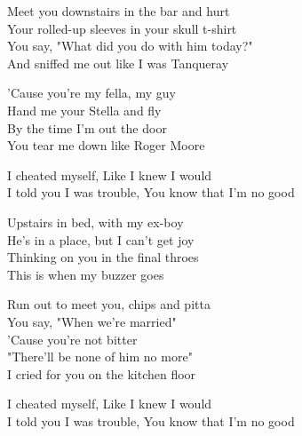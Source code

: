 \begin{paracol}{3}




    Meet you downstairs in the bar and hurt \\
    Your rolled-up sleeves in your skull t-shirt \\
    You say, "What did you do with him today?" \\
    And sniffed me out like I was Tanqueray \\



    'Cause you're my fella, my guy \\
    Hand me your Stella and fly \\
    By the time I'm out the door \\
    You tear me down like Roger Moore \\



    I cheated myself, Like I knew I would \\
    I told you I was trouble, You know that I'm no good \\



    \switchcolumn



    Upstairs in bed, with my ex-boy \\
    He's in a place, but I can't get joy \\
    Thinking on you in the final throes \\
    This is when my buzzer goes \\




    Run out to meet you, chips and pitta \\
    You say, "When we're married" \\
    'Cause you're not bitter \\
    "There'll be none of him no more" \\
    I cried for you on the kitchen floor \\



    I cheated myself, Like I knew I would \\
    I told you I was trouble, You know that I'm no good \\



\end{paracol}
